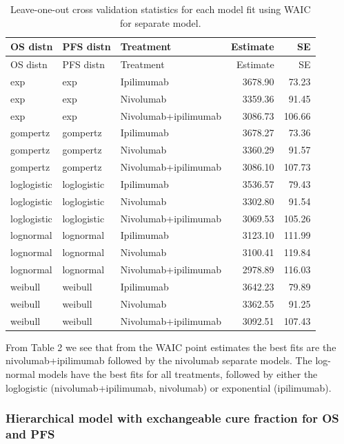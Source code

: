 \documentclass[
]{article}
\begin{document}
\begin{longtable}[]{@{}lllrr@{}}
\caption{Leave-one-out cross validation statistics for each model fit
using WAIC for separate model.}\tabularnewline
\toprule
OS distn & PFS distn & Treatment & Estimate & SE \\
\midrule
\endfirsthead
\toprule
OS distn & PFS distn & Treatment & Estimate & SE \\
\midrule
\endhead
exp & exp & Ipilimumab & 3678.90 & 73.23 \\
exp & exp & Nivolumab & 3359.36 & 91.45 \\
exp & exp & Nivolumab+ipilimumab & 3086.73 & 106.66 \\
gompertz & gompertz & Ipilimumab & 3678.27 & 73.36 \\
gompertz & gompertz & Nivolumab & 3360.29 & 91.57 \\
gompertz & gompertz & Nivolumab+ipilimumab & 3086.10 & 107.73 \\
loglogistic & loglogistic & Ipilimumab & 3536.57 & 79.43 \\
loglogistic & loglogistic & Nivolumab & 3302.80 & 91.54 \\
loglogistic & loglogistic & Nivolumab+ipilimumab & 3069.53 & 105.26 \\
lognormal & lognormal & Ipilimumab & 3123.10 & 111.99 \\
lognormal & lognormal & Nivolumab & 3100.41 & 119.84 \\
lognormal & lognormal & Nivolumab+ipilimumab & 2978.89 & 116.03 \\
weibull & weibull & Ipilimumab & 3642.23 & 79.89 \\
weibull & weibull & Nivolumab & 3362.55 & 91.25 \\
weibull & weibull & Nivolumab+ipilimumab & 3092.51 & 107.43 \\
\bottomrule
\end{longtable}

From Table 2 we see that from the WAIC point estimates the best fits are
the nivolumab+ipilimumab followed by the nivolumab separate models. The
log-normal models have the best fits for all treatments, followed by
either the loglogistic (nivolumab+ipilimumab, nivolumab) or exponential
(ipilimumab).

\hypertarget{hierarchical-model-with-exchangeable-cure-fraction-for-os-and-pfs}{%
\subsubsection{Hierarchical model with exchangeable cure fraction for OS
and
PFS}\label{hierarchical-model-with-exchangeable-cure-fraction-for-os-and-pfs}}
\end{document}
